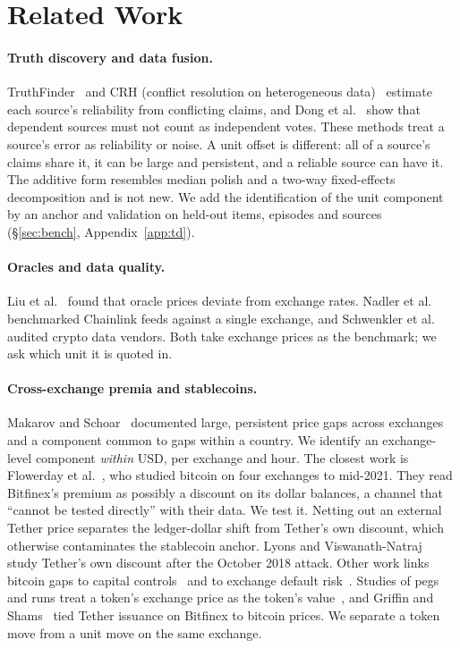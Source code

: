 \documentclass[sigconf,review,anonymous]{acmart}
\begin{document}
\section{Related Work}
\label{sec:related}
\paragraph{Truth discovery and data fusion.} TruthFinder~\cite{yin2008truth} and CRH (conflict resolution on heterogeneous data)~\cite{li2014resolving} estimate
each source's reliability from conflicting claims, and Dong et al.~\cite{dong2009integrating} show that dependent
sources must not count as independent votes. These methods treat a source's error as reliability or noise. A unit
offset is different: all of a source's claims share it, it can be large and persistent, and a
reliable source can have it. The additive form resembles median polish and a two-way fixed-effects decomposition and is not new. We add the identification of the unit component by an anchor and
validation on held-out items, episodes and sources (\S\ref{sec:bench}, Appendix~\ref{app:td}).

\paragraph{Oracles and data quality.} Liu et al.~\cite{liu2021oracles} found that oracle prices deviate from exchange
rates. Nadler et al.~\cite{nadler2026oracles} benchmarked Chainlink feeds against a single exchange, and Schwenkler et
al.~\cite{schwenkler2026aggregate} audited crypto data vendors. Both take exchange prices as the benchmark; we ask which unit it is quoted in.

\paragraph{Cross-exchange premia and stablecoins.} Makarov and Schoar~\cite{makarov2020trading} documented large,
persistent price gaps across exchanges and a component common to gaps within a country. We identify an
exchange-level component \emph{within} USD, per exchange and hour. The closest work is Flowerday et al.~\cite{flowerday2026bitcoin}, who studied bitcoin on four exchanges to mid-2021.
They read Bitfinex's premium as possibly a discount on its dollar balances, a channel that ``cannot be tested
directly'' with their data. We test it. Netting out an external Tether price
separates the ledger-dollar shift from Tether's own discount, which otherwise contaminates the stablecoin anchor.
Lyons and Viswanath-Natraj~\cite{lyons2023keeps} study Tether's own discount after the October 2018 attack. Other work links bitcoin gaps to capital controls~\cite{choi2019kimchi,borri2023discounts} and to exchange
default risk~\cite{guo2025default}. Studies of pegs and runs treat a token's exchange price as the token's
value~\cite{ma2025runs,liu2023anatomy}, and Griffin and Shams~\cite{griffin2020untethered} tied Tether issuance on
Bitfinex to bitcoin prices. We separate a token move from a unit move on the same exchange.
\end{document}
